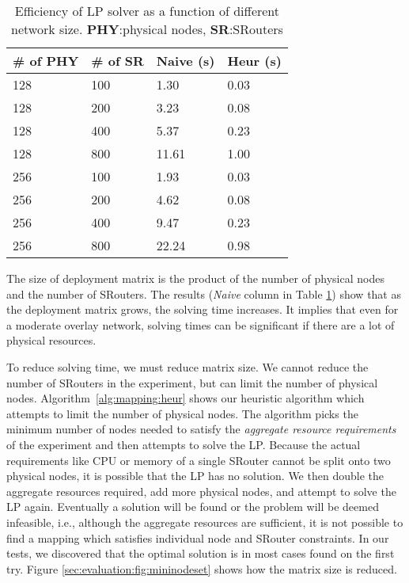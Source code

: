 \documentclass[conference]{IEEEtran}
\begin{document}
\begin{table}[!tb]
  \begin{tabular}{ | p{1.6cm} | p{1.6cm} | p{1.6cm} | p{1.6cm} | }
    \hline
    \# of PHY & \# of SR & Naive (s) & Heur (s) \\
    \hline
    128 & 100 & 1.30 & 0.03 \\
    \hline
    128 & 200 & 3.23 & 0.08 \\
    \hline
    128 & 400 & 5.37 & 0.23 \\
    \hline
    128 & 800 & 11.61 & 1.00 \\
    \hline
    \hline
    256 & 100 & 1.93 & 0.03 \\
    \hline
    256 & 200 & 4.62 & 0.08 \\
    \hline
    256 & 400 & 9.47  & 0.23 \\
    \hline
    256 & 800 & 22.24 & 0.98 \\
    \hline
  \end{tabular}
  \caption{Efficiency of LP solver as a function of different network size. \textbf{PHY}:physical nodes, \textbf{SR}:SRouters}
  \label{sec:evaluation:tab:lpsolver}
  \vskip -5mm
\end{table}

The size of deployment matrix is the product of the number of physical
nodes and the number of SRouters.  The results (\textit{Naive} column
in Table \ref{sec:evaluation:tab:lpsolver}) show that as the
deployment matrix grows, the solving time increases.  It implies that
even for a moderate overlay network, solving times can be significant
if there are a lot of physical resources.


To reduce solving time, we must reduce matrix size. We cannot reduce
the number of SRouters in the experiment, but can limit the number of
physical nodes. Algorithm~\ref{alg:mapping:heur} shows our heuristic
algorithm which attempts to limit the number of physical nodes. The
algorithm picks the minimum number of nodes needed to satisfy the
\emph{aggregate resource requirements} of the experiment and then
attempts to solve the LP. Because the actual requirements like CPU or
memory of a single SRouter cannot be split onto two physical nodes, it
is possible that the LP has no solution. We then double the aggregate
resources required, add more physical nodes, and attempt to solve the
LP again. Eventually a solution will be found or the problem will be
deemed infeasible, i.e., although the aggregate resources are
sufficient, it is not possible to find a mapping which satisfies
individual node and SRouter constraints. In our tests, we discovered
that the optimal solution is in most cases found on the first
try. Figure \ref{sec:evaluation:fig:mininodeset} shows how the matrix
size is reduced.
\end{document}
